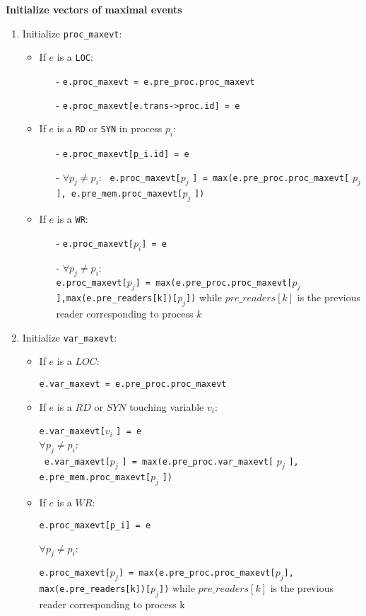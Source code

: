 \documentclass{llncs}
\begin{document}
\noindent
\textbf{Initialize vectors of maximal events}
\begin{enumerate}
	\item {Initialize \verb!proc_maxevt!:}
	\begin{itemize}
	\item
		If $e$ is a \verb!LOC!:
		\begin{itemize}
		\nonumber
		\item[-]
			\verb!e.proc_maxevt = e.pre_proc.proc_maxevt!
		\item[-]
			\verb!e.proc_maxevt[e.trans->proc.id] = e!		
		\end{itemize}
		
	\item
		If $e$ is a \verb!RD! or \verb!SYN! in process $p_i$: 
		\begin{itemize}
		\item[-]	
			\verb!e.proc_maxevt[p_i.id] = e!
		\item[-]
			$\forall p_j \neq p_i$: 
			\verb! e.proc_maxevt[!$p_j$ \verb!] = max(e.pre_proc.proc_maxevt[! $p_j$ \verb!], e.pre_mem.proc_maxevt[!$p_j$ \verb!])!
	
	\end{itemize}
		
	\item
		If $e$ is a \verb!WR!: 
		\begin{itemize}
		\item[-]		
			\verb!e.proc_maxevt[!$p_i$\verb!] = e!
		\item[-]
			$\forall p_j \neq p_i$: \\
			\verb!e.proc_maxevt[!$p_j$\verb!] = max(e.pre_proc.proc_maxevt[!$p_j$\verb!],max(e.pre_readers[k])[!$p_j$\verb!])!
		while $pre\_readers[k]$ is the previous reader corresponding to process $k$ 
		\end{itemize}
	\end{itemize}
	
	\item {Initialize \verb!var_maxevt!:}
	\begin{itemize}
		\item
		If $e$ is a $LOC$:
		
		\verb!e.var_maxevt = e.pre_proc.proc_maxevt!
		\item
		If $e$ is a $RD$ or $SYN$ touching variable $v_i$: 
		
		\verb!e.var_maxevt[!$v_i$ \verb!] = e!\\
		$\forall p_j \neq p_i$: \\
		\verb! e.var_maxevt[!$p_j$ \verb!] = max(e.pre_proc.var_maxevt[! $p_j$ \verb!], e.pre_mem.proc_maxevt[!$p_j$ \verb!])!
		
		\item
		If $e$ is a $WR$: 
		
		\verb!e.proc_maxevt[p_i] = e!
		
		$\forall p_j \neq p_i$:
		
		\verb!e.proc_maxevt[!$p_j$\verb!] = max(e.pre_proc.proc_maxevt[!$p_j$\verb!], max(e.pre_readers[k])[!$p_j$\verb!])!
		while $pre\_readers[k]$ is the previous reader corresponding to process k 
	\end{itemize}	
\end{enumerate}
\end{document}
